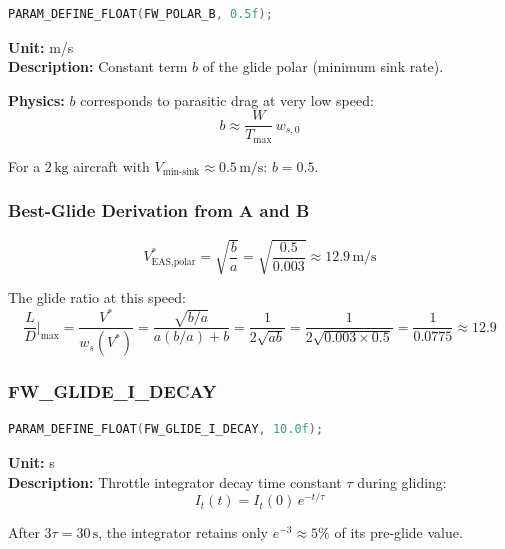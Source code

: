 \documentclass[12pt,a4paper]{article}
\begin{document}
\begin{lstlisting}[language=C]
PARAM_DEFINE_FLOAT(FW_POLAR_B, 0.5f);
\end{lstlisting}

\textbf{Unit:} m/s \\
\textbf{Description:} Constant term $b$ of the glide polar (minimum sink rate).

\textbf{Physics:} $b$ corresponds to parasitic drag at very low speed:
\begin{equation}
  b \approx \frac{W}{T_{\max}}\,w_{s,0}
\end{equation}

For a $2\,\text{kg}$ aircraft with $V_{\text{min-sink}} \approx 0.5\,\text{m/s}$:
$b = 0.5$.

\subsubsection{Best-Glide Derivation from A and B}

\begin{equation}
  \boxed{
    V^*_{\text{EAS,polar}} = \sqrt{\frac{b}{a}} = \sqrt{\frac{0.5}{0.003}} \approx 12.9\,\text{m/s}
  }
\end{equation}

The glide ratio at this speed:
\begin{equation}
  \frac{L}{D}\bigg|_{\text{max}} = \frac{V^*}{w_s(V^*)}
  = \frac{\sqrt{b/a}}{a(b/a) + b}
  = \frac{1}{2\sqrt{ab}}
  = \frac{1}{2\sqrt{0.003 \times 0.5}} = \frac{1}{0.0775} \approx 12.9
\end{equation}

\subsubsection{FW\_GLIDE\_I\_DECAY}

\begin{lstlisting}[language=C]
PARAM_DEFINE_FLOAT(FW_GLIDE_I_DECAY, 10.0f);
\end{lstlisting}

\textbf{Unit:} s \\
\textbf{Description:} Throttle integrator decay time constant $\tau$ during
gliding:
\begin{equation}
  I_t(t) = I_t(0)\,e^{-t/\tau}
\end{equation}

After $3\tau = 30\,\text{s}$, the integrator retains only $e^{-3} \approx 5\%$
of its pre-glide value.
\end{document}
